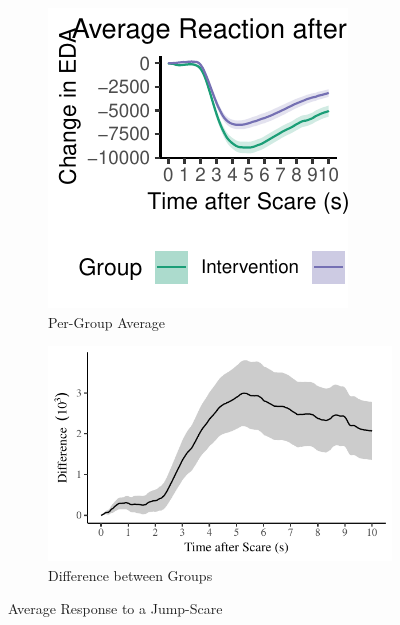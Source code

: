 \documentclass[12pt,a4paper]{article}\usepackage[]{graphicx}\usepackage[]{color}
\makeatletter
\def\maxwidth{ %
  \ifdim\Gin@nat@width>\linewidth
    \linewidth
  \else
    \Gin@nat@width
  \fi
}
\makeatother
\begin{document}
\begin{figure}
  \centering
  \begin{subfigure}[t]{.49\linewidth}


{\centering \includegraphics[width=\maxwidth]{figure/ResponseAfterScare-1} 

}



    \caption{Per-Group Average}
  \end{subfigure}
  \begin{subfigure}[t]{.49\linewidth}


{\centering \includegraphics[width=\maxwidth]{figure/CompareGroups-1} 

}



    \caption{Difference between Groups}
  \end{subfigure}
  \caption{Average Response to a Jump-Scare}
  \label{fig:ResponseAfterScare}
\end{figure}
\end{document}
